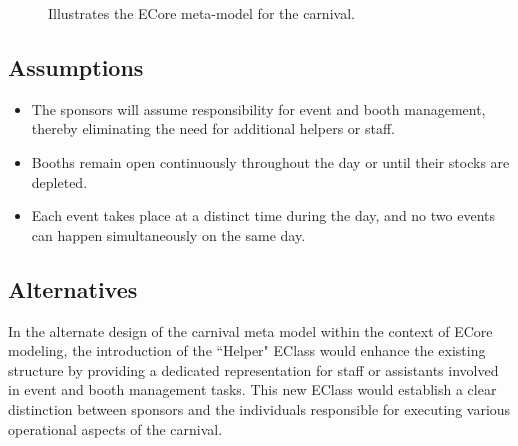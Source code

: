 \documentclass[a4paper,11pt]{report}
\begin{document}
\begin{figure}[ht]
\begin{center}
\caption{{\footnotesize Illustrates the ECore meta-model for the carnival.}}
\label{Fig1}
\end{center}
\end{figure}

\subsection{Assumptions}

\begin{itemize}
	\item The sponsors will assume responsibility for event and booth management, thereby eliminating the need for additional helpers or staff.
	\item Booths remain open continuously throughout the day or until their stocks are depleted.
	\item Each event takes place at a distinct time during the day, and no two events can happen simultaneously on the same day.
\end{itemize}

\subsection{Alternatives}
In the alternate design of the carnival meta model within the context of ECore modeling, the introduction of the ``Helper" EClass would enhance the existing structure by providing a dedicated representation for staff or assistants involved in event and booth management tasks. This new EClass would establish a clear distinction between sponsors and the individuals responsible for executing various operational aspects of the carnival.\\
\end{document}
